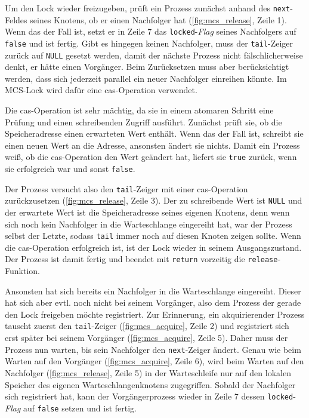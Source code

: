 Um den Lock wieder freizugeben,
prüft ein Prozess zunächst anhand des \texttt{next}-Feldes seines Knotens,
ob er einen Nachfolger hat (\autoref{fig:mcs_release}, Zeile 1).
Wenn das der Fall ist,
setzt er in Zeile 7 das \texttt{locked}-\textit{Flag} seines Nachfolgers auf \texttt{false}
und ist fertig.
Gibt es hingegen keinen Nachfolger,
muss der \texttt{tail}-Zeiger zurück auf \texttt{NULL} gesetzt werden,
damit der nächste Prozess nicht fälschlicherweise denkt,
er hätte einen Vorgänger.
Beim Zurücksetzen muss aber berücksichtigt werden,
dass sich jederzeit parallel ein neuer Nachfolger einreihen könnte.
Im MCS-Lock wird dafür eine \gls{cas}-Operation verwendet.

Die \gls{cas}-Operation ist sehr mächtig,
da sie in einem atomaren Schritt eine Prüfung
und einen schreibenden Zugriff ausführt.
Zunächst prüft sie,
ob die Speicheradresse einen erwarteten Wert enthält.
Wenn das der Fall ist,
schreibt sie einen neuen Wert an die Adresse,
ansonsten ändert sie nichts.
Damit ein Prozess weiß,
ob die \gls{cas}-Operation den Wert geändert hat,
liefert sie \texttt{true} zurück,
wenn sie erfolgreich war
und sonst \texttt{false}.

Der Prozess versucht also den \texttt{tail}-Zeiger mit einer \gls{cas}-Operation zurückzusetzen (\autoref{fig:mcs_release}, Zeile 3).
Der zu schreibende Wert ist \texttt{NULL}
und der erwartete Wert ist die Speicheradresse seines eigenen Knotens,
denn wenn sich noch kein Nachfolger in die Warteschlange eingereiht hat,
war der Prozess selbst der Letzte,
sodass \texttt{tail} immer noch auf diesen Knoten zeigen sollte.
Wenn die \gls{cas}-Operation erfolgreich ist,
ist der Lock wieder in seinem Ausgangszustand.
Der Prozess ist damit fertig und beendet mit \texttt{return} vorzeitig die \texttt{release}-Funktion.

Ansonsten hat sich bereits ein Nachfolger in die Warteschlange eingereiht.
Dieser hat sich aber evtl. noch nicht bei seinem Vorgänger,
also dem Prozess der gerade den Lock freigeben möchte registriert.
Zur Erinnerung,
ein akquirierender Prozess tauscht zuerst den \texttt{tail}-Zeiger (\autoref{fig:mcs_acquire}, Zeile 2)
und registriert sich erst später bei seinem Vorgänger (\autoref{fig:mcs_acquire}, Zeile 5).
Daher muss der Prozess nun warten,
bis sein Nachfolger den \texttt{next}-Zeiger ändert.
Genau wie beim Warten auf den Vorgänger (\autoref{fig:mcs_acquire}, Zeile 6),
wird beim Warten auf den Nachfolger (\autoref{fig:mcs_release}, Zeile 5)
in der Warteschleife nur auf den lokalen Speicher des eigenen Warteschlangenknotens zugegriffen.
Sobald der Nachfolger sich registriert hat,
kann der Vorgängerprozess wieder in Zeile 7 dessen \texttt{locked}-\textit{Flag} auf \texttt{false} setzen
und ist fertig.

